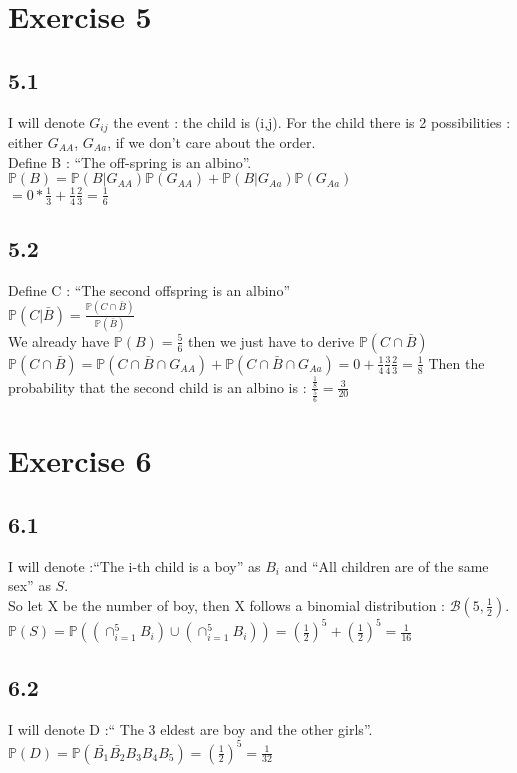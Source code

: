 \documentclass{article}
\begin{document}
    \section*{Exercise 5}
    \subsection*{5.1}
    I will denote $G_{ij}$ the event : the child is (i,j).
    For the child there is 2 possibilities : either $G_{AA}$, $G_{Aa}$, if we don't care about the order.
    \\
    Define B : ``The off-spring is an albino''.
    \\
    $\mathbb{P}(B) = \mathbb{P}(B|G_{AA})\mathbb{P}(G_{AA}) + \mathbb{P}(B|G_{Aa})\mathbb{P}(G_{Aa})$\\
    $=0*\frac{1}{3}+\frac{1}{4}\frac{2}{3} = \frac{1}{6}$    
    \subsection*{5.2}
    Define C : ``The second offspring is an albino''
    \\
    $\mathbb{P}(C|\bar{B}) = \frac{\mathbb{P}(C\cap \bar{B})}{\mathbb{P}(\bar{B})}$
    \\
    We already have $\mathbb{P}(B) = \frac{5}{6}$ then we just have to derive $\mathbb{P}(C\cap \bar{B})$
    $\mathbb{P}(C \cap \bar{B}) = \mathbb{P}(C\cap \bar{B}\cap G_{AA})+\mathbb{P}(C\cap \bar{B}\cap G_{Aa}) = 0+\frac{1}{4}\frac{3}{4}\frac{2}{3} = \frac{1}{8} $
    Then the probability that the second child is an albino is  : $\frac{\frac{1}{8}}{\frac{5}{6}} = \frac{3}{20}$
    
    \section*{Exercise 6}
    \subsection*{6.1}
    I will denote :``The i-th child is a boy'' as $B_i$ and  ``All children are of the same sex'' as $S$.
    \\
    So let X be the number of boy, then X follows a binomial distribution : $\mathcal{B}(5,\frac{1}{2})$.
    \\
    $\mathbb{P}(S) = \mathbb{P}((\cap_{i=1}^5 B_i)\cup(\cap_{i=1}^5 B_i)) = (\frac{1}{2})^5+(\frac{1}{2})^5 = \frac{1}{16}$
    \subsection*{6.2}
    I will denote D :`` The 3 eldest are boy and the other girls''.
    \\
    $\mathbb{P}(D) = \mathbb{P}(\bar{B_1}\bar{B_2}B_3B_4B_5) = (\frac{1}{2})^5 = \frac{1}{32}$
\end{document}
